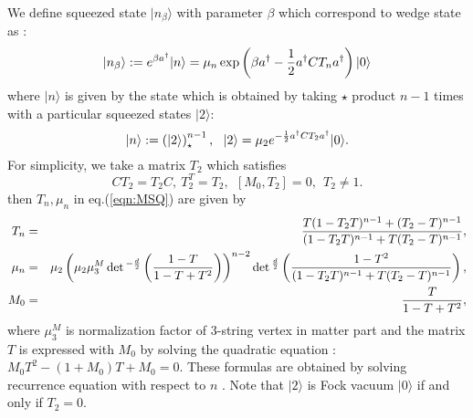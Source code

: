 \documentclass[12pt,a4paper]{article}
\begin{document}
We define squeezed state $|n_\beta\rangle$ with parameter $\beta$ which correspond to wedge  state as :
\begin{equation}
\label{eqn:MSQ}
|n_\beta\rangle:=e^{\beta a^\dagger}|n\rangle=\mu_n \exp\left(\beta a^\dagger-{1\over2}a^\dagger CT_na^\dagger\right)|0\rangle 
\end{equation}
where $|n\rangle$ is given by the state which is obtained by taking $\star$ product $n-1$ times with a particular squeezed states $|2\rangle$:
\begin{equation}
\label{eqn:NMD}
|n\rangle:=\left(|2\rangle\right)_\star^{n-1},\ \ |2\rangle=\mu_2 e^{-{1\over2}a^\dagger CT_2a^\dagger}|0\rangle.
\end{equation}
For simplicity, we take a matrix $T_2$ which satisfies
\begin{equation}
CT_2=T_2C,\ T_2^T=T_2,\ \ [M_0,T_2]=0,\ \ T_2\not=1.
\end{equation}
then $T_n,\mu_n$ in eq.(\ref{eqn:MSQ}) are given by
\begin{eqnarray}
\label{eqn:TMN}
T_n&=&{T(1-T_2T)^{n-1}+(T_2-T)^{n-1}\over(1-T_2T)^{n-1}+T(T_2-T)^{n-1}},\nonumber \\
\mu_n&=&\mu_2\left(\mu_2\mu_3^M \det{}^{-{d\over2}}\left({1-T\over1-T+T^2}\right)\right)^{n-2}\det{}^{d\over2}\left({1-T^2\over(1-T_2T)^{n-1}+T(T_2-T)^{n-1}}\right),\nonumber \\
M_0&=&{T\over1-T+T^2},
\end{eqnarray}
where $\mu_3^M$ is normalization factor of 3-string vertex in matter part and
 the matrix $T$ is expressed with $M_0$ by solving the quadratic equation : $M_0T^2-(1+M_0)T+M_0=0$.
These formulas are obtained by solving recurrence equation with respect to $n$ \cite{FO}. Note that $|2\rangle$ is Fock vacuum $|0\rangle$ if and only if  $T_2=0$.
\end{document}
